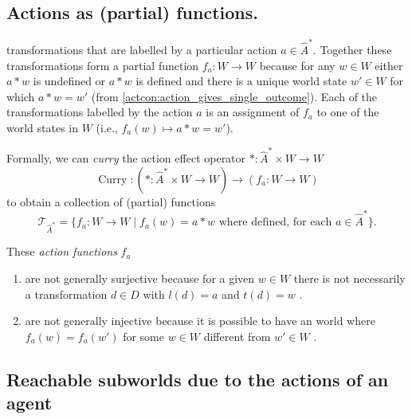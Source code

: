 \subsection{Actions as (partial) functions.}

 transformations that are labelled by a particular action $a \in \hat{A}^{*}$.
Together these transformations form a partial function $f_{a}: W \to W$ because for any $w \in W$ either $a \ast w$ is undefined or $a \ast w$ is defined and there is a unique world state $w' \in W$ for which $a \ast w = w'$ (from \cref{actcon:action_gives_single_outcome}).
Each of the transformations labelled by the action $a$ is an assignment of $f_{a}$ to one of the world states in $W$ (i.e., $f_{a}(w) \mapsto a \ast w = w'$).

Formally, we can \emph{curry} the action effect operator $\ast : \hat{A}^{*} \times W \to W$
\begin{equation}
	\operatorname{Curry}: (\ast: \hat{A}^{*} \times W \to W) \to (f_{a}: W \to W)
\end{equation}
to obtain a collection of (partial) functions
\begin{equation}
	\mathcal{T}_{\hat{A}^{*}} = \{f_{a}: W \to W \mid f_{a}(w) = a \ast w \text{ where defined, for each } a \in \hat{A}^{*} \}.
\end{equation}

These \emph{action functions} $f_{a}$
\begin{enumerate}
    \item are not generally surjective because for a given $w \in W$ there is not necessarily a transformation $d \in D$ with $l(d) = a$ and $t(d) = w$ .

    \item are not generally injective because it is possible to have an world where $f_{a}(w)=f_{a}(w')$ for some $w \in W$ different from $w' \in W$ .
\end{enumerate}


\subsection{Reachable subworlds due to the actions of an agent}

